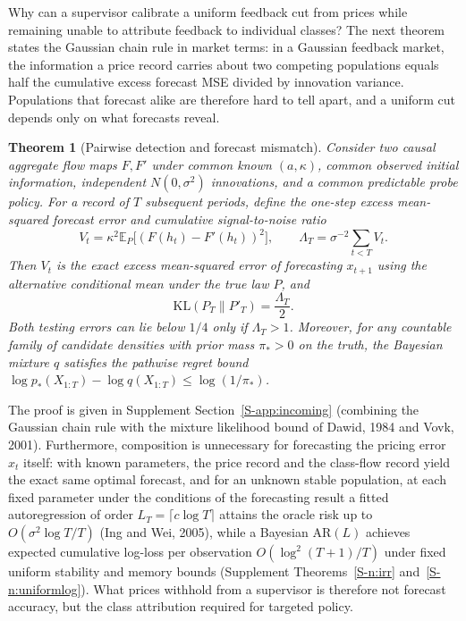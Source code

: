 \documentclass[11pt,letterpaper]{article}
\newtheorem{theorem}{Theorem}[section]
\theoremstyle{definition}
\newcommand{\E}{\mathbb{E}}
\newcommand{\KL}{\mathrm{KL}}
\begin{document}
Why can a supervisor calibrate a uniform feedback cut from prices while remaining unable to attribute feedback to individual classes? The next theorem states the Gaussian chain rule in market terms: in a Gaussian feedback market, the information a price record carries about two competing populations equals half the cumulative excess forecast MSE divided by innovation variance. Populations that forecast alike are therefore hard to tell apart, and a uniform cut depends only on what forecasts reveal.

\begin{theorem}[Pairwise detection and forecast mismatch]\label{n:dual}
Consider two causal aggregate flow maps $F, F'$ under common known $(a, \kappa)$, common observed initial information, independent $N(0, \sigma^2)$ innovations, and a common predictable probe policy. For a record of $T$ subsequent periods, define the one-step excess mean-squared forecast error and cumulative signal-to-noise ratio
\[
  V_t = \kappa^2 \E_P\bigl[(F(h_t) - F'(h_t))^2\bigr], \qquad \Lambda_T = \sigma^{-2} \sum_{t < T} V_t.
\]
Then $V_t$ is the exact excess mean-squared error of forecasting $x_{t+1}$ using the alternative conditional mean under the true law $P$, and
\[
  \KL(P_T \| P'_T) = \frac{\Lambda_T}{2}.
\]
Both testing errors can lie below $1/4$ only if $\Lambda_T > 1$. Moreover, for any countable family of candidate densities with prior mass $\pi_* > 0$ on the truth, the Bayesian mixture $q$ satisfies the pathwise regret bound $\log p_*(X_{1:T}) - \log q(X_{1:T}) \le \log(1/\pi_*)$.
\end{theorem}

The proof is given in Supplement Section~\ref{S-app:incoming} (combining the Gaussian chain rule with the mixture likelihood bound of Dawid, 1984 and Vovk, 2001). Furthermore, composition is unnecessary for forecasting the pricing error $x_t$ itself: with known parameters, the price record and the class-flow record yield the exact same optimal forecast, and for an unknown stable population, at each fixed parameter under the conditions of the forecasting result a fitted autoregression of order $L_T = \lceil c \log T \rceil$ attains the oracle risk up to $O(\sigma^2 \log T / T)$ (Ing and Wei, 2005), while a Bayesian $\mathrm{AR}(L)$ achieves expected cumulative log-loss per observation $O(\log^2(T+1)/T)$ under fixed uniform stability and memory bounds (Supplement Theorems~\ref{S-n:irr} and~\ref{S-n:uniformlog}). What prices withhold from a supervisor is therefore not forecast accuracy, but the class attribution required for targeted policy.
\end{document}
